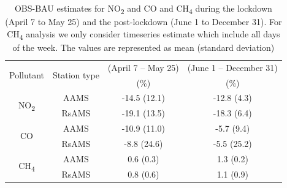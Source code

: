 \begin{table}[tbh!]
    \centering
    \caption[short]{OBS-BAU estimates for NO\textsubscript{2} and CO and CH\textsubscript{4} during the lockdown (April 7 to May 25) and the post-lockdown (June 1 to December 31). For CH\textsubscript{4} analysis we only consider timeseries estimate which include all days of the week. The values are represented as mean (standard deviation)}
    \begin{tabular}{c c c c}
    \hline
    \multirow{2}{*}{Pollutant} & \multirow{2}{*}{Station type} & (April 7 – May 25) & (June 1 – December 31) \\ 
                                &                              & (\%) & (\%) \\ \hline
    \multirow{2}{*}{NO\textsubscript{2}} & AAMS & -14.5 (12.1) & -12.8 (4.3)  \\
        & RsAMS & -19.1 (13.5) & -18.3 (6.4)  \\ \hline
    \multirow{2}{*}{CO} & AAMS & -10.9 (11.0) & -5.7 (9.4)  \\
        & RsAMS & -8.8 (24.6) & -5.5 (25.2)  \\ \hline
    \multirow{2}{*}{CH\textsubscript{4}} & AAMS & 0.6 (0.3) & 1.3 (0.2)  \\
        & RsAMS & 0.8 (0.6) & 1.1 (0.9)  \\ \hline
    \end{tabular}
    \label{tab:chap4_tab3}
\end{table}

